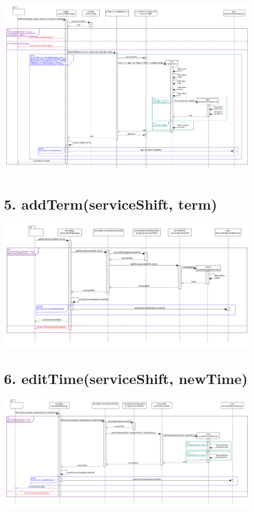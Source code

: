 \begin{center}
  \includegraphics[scale = 0.23]{images/DSD/Esame DSD 1c.png}
\end{center}
\pagebreak
\section*{5. addTerm(serviceShift, term)}

\begin{center}
  \includegraphics[scale = 0.28]{images/DSD/Esame DSD 5.png}
\end{center}
\pagebreak
\section*{6. editTime(serviceShift, newTime)}

\begin{center}
  \includegraphics[scale = 0.24]{images/DSD/Esame DSD 6.png}
\end{center}
\pagebreak

